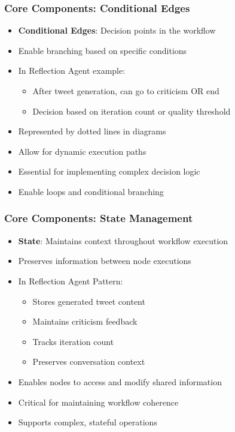 \begin{frame}[fragile]\frametitle{Core Components: Conditional Edges}
      \begin{itemize}
        \item \textbf{Conditional Edges}: Decision points in the workflow
        \item Enable branching based on specific conditions
        \item In Reflection Agent example:
        \begin{itemize}
            \item After tweet generation, can go to criticism OR end
            \item Decision based on iteration count or quality threshold
        \end{itemize}
        \item Represented by dotted lines in diagrams
        \item Allow for dynamic execution paths
        \item Essential for implementing complex decision logic
        \item Enable loops and conditional branching
      \end{itemize}
\end{frame}

\begin{frame}[fragile]\frametitle{Core Components: State Management}
      \begin{itemize}
        \item \textbf{State}: Maintains context throughout workflow execution
        \item Preserves information between node executions
        \item In Reflection Agent Pattern:
        \begin{itemize}
            \item Stores generated tweet content
            \item Maintains criticism feedback
            \item Tracks iteration count
            \item Preserves conversation context
        \end{itemize}
        \item Enables nodes to access and modify shared information
        \item Critical for maintaining workflow coherence
        \item Supports complex, stateful operations
      \end{itemize}
\end{frame}

